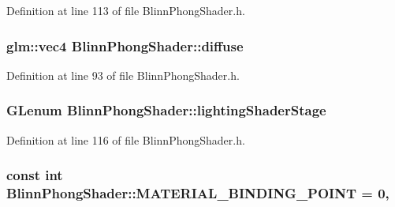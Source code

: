Definition at line 113 of file Blinn\+Phong\+Shader.\+h.

\hypertarget{class_blinn_phong_shader_ae74d0446ec1a871ca57caf002f52e20c}{}
\subsubsection[{diffuse}]{\setlength{\rightskip}{0pt plus 5cm}glm\+::vec4 Blinn\+Phong\+Shader\+::diffuse\hspace{0.3cm}{\ttfamily [protected]}}\label{class_blinn_phong_shader_ae74d0446ec1a871ca57caf002f52e20c}


Definition at line 93 of file Blinn\+Phong\+Shader.\+h.

\hypertarget{class_blinn_phong_shader_a942775771a09fd5553409bdb44ec32ac}{}
\subsubsection[{lighting\+Shader\+Stage}]{\setlength{\rightskip}{0pt plus 5cm}G\+Lenum Blinn\+Phong\+Shader\+::lighting\+Shader\+Stage\hspace{0.3cm}{\ttfamily [private]}}\label{class_blinn_phong_shader_a942775771a09fd5553409bdb44ec32ac}


Definition at line 116 of file Blinn\+Phong\+Shader.\+h.

\hypertarget{class_blinn_phong_shader_a44b4e326871466fe9f2346eb1ac40253}{}
\subsubsection[{M\+A\+T\+E\+R\+I\+A\+L\+\_\+\+B\+I\+N\+D\+I\+N\+G\+\_\+\+P\+O\+I\+N\+T}]{\setlength{\rightskip}{0pt plus 5cm}const int Blinn\+Phong\+Shader\+::\+M\+A\+T\+E\+R\+I\+A\+L\+\_\+\+B\+I\+N\+D\+I\+N\+G\+\_\+\+P\+O\+I\+N\+T = 0\hspace{0.3cm}{\ttfamily [static]}, {\ttfamily [protected]}}\label{class_blinn_phong_shader_a44b4e326871466fe9f2346eb1ac40253}


